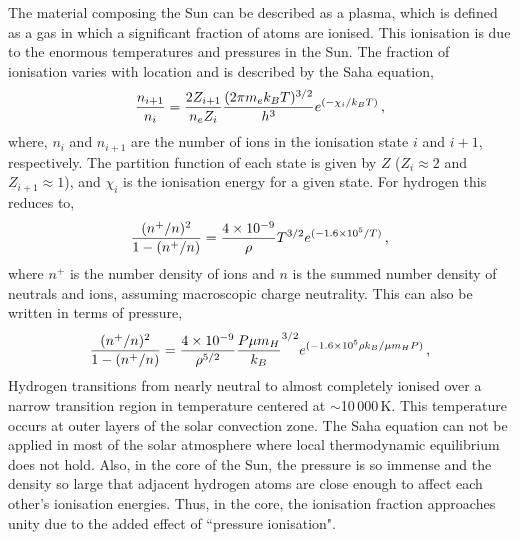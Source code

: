 The material composing the Sun can be described as a plasma, which is defined as a gas in which a significant fraction of atoms are ionised. This ionisation is due to the enormous temperatures and pressures in the Sun. The fraction of ionisation varies with location and is described by the Saha equation,
\begin{equation}
\frac{n_{i+1}}{n_i} = \frac{2 Z_{i+1}}{n_e Z_i} \frac{(2 \pi m_e k_B T)^{3/2}}{h^3} e^{( -\chi_i/k_B T)} \mbox{\,,}
\end{equation}
where, $n_{i}$ and $n_{i+1}$ are the number of ions in the ionisation state $i$ and $i+1$, respectively. The partition function of each state is given by $Z$ ($Z_{i} \approx 2$ and $Z_{i+1} \approx 1$), %
and $\chi_i$ is the ionisation energy for a given state.
For hydrogen this reduces to, 
\begin{equation}\label{eqn:saha}
\frac{(n^+/n)^2}{1-(n^+/n)}=\frac{4\times10^{-9}}{\rho} T^{3/2} e^{(-1.6 \times 10^5 / T)} \mbox{\,,}
\end{equation}
where $n^+$ is the number density of ions and $n$ is the summed number density of neutrals and ions, assuming macroscopic charge neutrality. This can also be written in terms of pressure,
\begin{equation}\label{eqn:sahap}
\frac{(n^+/n)^2}{1-(n^+/n)}=\frac{4\times10^{-9}}{\rho^{5/2}} {\frac{P\mu m_H}{k_B}}^{3/2} e^{(-1.6 \times 10^5 \rho k_B /\mu m_H P)} \mbox{\,,}
\end{equation}
Hydrogen transitions from nearly neutral to almost completely ionised over a narrow transition region in temperature centered at $\sim$10\,000\,K. This temperature occurs at outer layers of the solar convection zone. The Saha equation can not be applied in most of the solar atmosphere where local thermodynamic equilibrium does not hold. Also, in the core of the Sun, the pressure is so immense and the density so large that adjacent hydrogen atoms are close enough to affect each other's ionisation energies. Thus, in the core, the ionisation fraction approaches unity due to the added effect of ``pressure ionisation".

